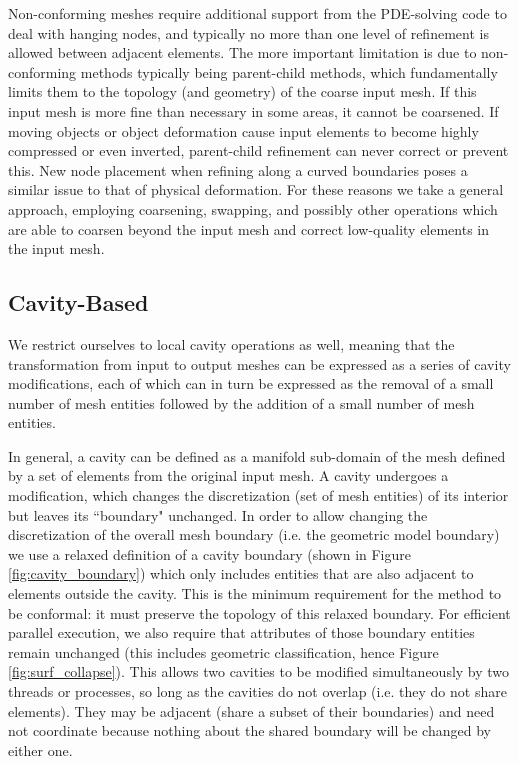 Non-conforming meshes require additional support from
the PDE-solving code to deal with hanging nodes, and typically
no more than one level of refinement is allowed between adjacent
elements.
The more important limitation is due to non-conforming methods
typically being parent-child methods, which fundamentally limits
them to the topology (and geometry) of the coarse input mesh.
If this input mesh is more fine than necessary in some areas,
it cannot be coarsened.
If moving objects or object deformation cause input elements
to become highly compressed or even inverted, parent-child
refinement can never correct or prevent this.
New node placement when refining along a curved boundaries poses
a similar issue to that of physical deformation.
For these reasons we take a general approach, employing
coarsening, swapping, and possibly other operations which are
able to coarsen beyond the input mesh and correct low-quality
elements in the input mesh.

\subsection{Cavity-Based}
\label{sec:cavity}

We restrict ourselves to local cavity operations as well,
meaning that the transformation from input to output meshes
can be expressed as a series of cavity modifications, each
of which can in turn be expressed as the removal of
a small number of mesh entities followed by the addition
of a small number of mesh entities.

In general, a cavity can be defined as a manifold sub-domain
of the mesh defined by a set of elements from the original
input mesh.
A cavity undergoes a modification, which changes the discretization
(set of mesh entities) of its interior but leaves its ``boundary" unchanged.
In order to allow changing the discretization of the overall
mesh boundary (i.e. the geometric model boundary)
we use a relaxed definition of a cavity boundary
(shown in Figure \ref{fig:cavity_boundary}) which only includes
entities that are also adjacent to elements outside the cavity.
This is the minimum requirement for the method to be conformal:
it must preserve the topology of this relaxed boundary.
For efficient parallel execution, we also require that attributes
of those boundary entities remain unchanged (this includes
geometric classification, hence Figure \ref{fig:surf_collapse}).
This allows two cavities to be modified simultaneously by two
threads or processes, so long as the cavities do not overlap
(i.e. they do not share elements).
They may be adjacent (share a subset of their boundaries) and
need not coordinate because nothing about the shared boundary
will be changed by either one.

